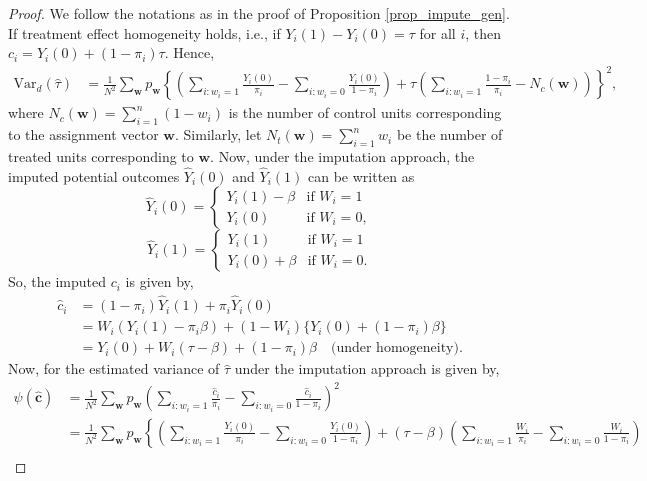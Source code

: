 \documentclass[12pt]{article}
\newcommand{\Var}{{\text{Var}}}
\begin{document}
\begin{proof}
We follow the notations as in the proof of Proposition \ref{prop_impute_gen}. If treatment effect homogeneity holds, i.e., if $Y_i(1) -Y_i(0) = \tau$ for all $i$, then $c_i = Y_i(0) + (1-\pi_i)\tau$. Hence,
\begin{align}
   \Var_d(\hat{\tau}) & =   \frac{1}{N^2}\sum_{\bm{w}} p_{\bm{w}} \left\{ \left(\sum_{i:w_{i} = 1}\frac{Y_{i}(0)}{\pi_{i}} - \sum_{i:w_{i} = 0}\frac{Y_{i}(0)}{1-\pi_{i}} \right) + \tau \left(\sum_{i:w_i=1}\frac{1 - \pi_i}{\pi_i} - N_c(\bm{w}) \right) \right\}^2, \label{eq_A_impute2}
\end{align}
where $N_c(\bm{w}) = \sum_{i=1}^{n}(1-w_i)$ is the number of control units corresponding to the assignment vector $\bm{w}$. Similarly, let $N_t(\bm{w}) = \sum_{i=1}^{n}w_i$ be the number of treated units corresponding to $\bm{w}$.
Now, under the imputation approach, the imputed potential outcomes $\hat{Y}_i(0)$ and $\hat{Y}_i(1)$ can be written as
\begin{equation}
  \hat{Y}_i(0) = 
    \begin{cases}
     Y_i(1) - \beta & \text{if $W_i = 1$}\\
    Y_i(0) & \text{if $W_i = 0$},
    \end{cases}       
\end{equation}
\begin{equation}
  \hat{Y}_i(1) =
    \begin{cases}
     Y_i(1) & \text{if $W_i = 1$}\\
    Y_i(0) + \beta & \text{if $W_i = 0$}.
    \end{cases}       
\end{equation}
So, the imputed $c_i$ is given by,
\begin{align}
    \hat{c}_i & = (1-\pi_i)\hat{Y}_i(1) + \pi_i \hat{Y}_i(0) \nonumber \\
    & = W_i(Y_i(1) -\pi_i \beta) + (1-W_i)\{Y_i(0) + (1-\pi_i)\beta\} \nonumber \\
    & = Y_i(0) + W_i(\tau - \beta) + (1 - \pi_i)\beta \quad \text{(under homogeneity)}.
\end{align}
Now, for the estimated variance of $\hat{\tau}$ under the imputation approach is given by,
\begin{align}
    \psi(\hat{\bm{c}}) & = \frac{1}{N^2}\sum_{\bm{w}} p_{\bm{w}} \left(\sum_{i:w_{i} = 1}\frac{\hat{c}_{i}}{\pi_{i}} - \sum_{i:w_{i} = 0}\frac{\hat{c}_{i}}{1-\pi_{i}} \right)^2 \nonumber \\
    & = \frac{1}{N^2} \sum_{\bm{w}}p_{\bm{w}} \left\{ \left(\sum_{i:w_i = 1}\frac{Y_i(0)}{\pi_i} - \sum_{i:w_i = 0}\frac{Y_i(0)}{1-\pi_i} \right) + (\tau - \beta) \left(\sum_{i:w_i = 1}\frac{W_i}{\pi_i} - \sum_{i:w_i = 0}\frac{W_i}{1-\pi_i} \right) \right. \nonumber \\

\end{align}
\end{proof}
\end{document}
